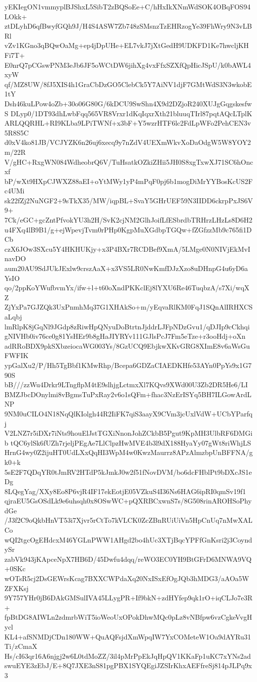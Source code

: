 yEKIegON1vmmyplBJShxL5SibT2zBQSoEe+C/hHxIkXNmWdSOK4OBqFOS94LOkk+
ztDLyhD6qfBwyfGQh9J/H4S4ASW7Zb748zSMsnzTzEHRzogYe39FhWry9N3vLBRl
vZv1KGno3qBQwOaMg+ep4jDpUHe+EL7vkJ7jXtGedH9UDKFD1Ke7hwcljKHFi7T+
E0nrQ7pCGswPNM3eJb6JF5oWCtDW6jihXg4vxFfxSZXfQpHicJSpU/k0bAWL4xyW
qf/MZ8UW/8fJ5XIS4h1GraCbDzGO5ClebCk5Y7AiNV1djF7GMtWdS3N3wkobE1tY
Dsh46kuLPow4oZb+30o06G80G/6kDCU9SwShn4X9d2DZjoR240XUJgGqgskesfwS
DLyp0/1DT93dhLwbFqq565VR8Vrxr1dKqIqxrXth21bluuqTIrl87pqtAQcLTplK
ARLQQRHL+RI9KLba9LPiTWNf+x3bF+Y5wzrHTF6lc2FdLpWFo2PehCEN3v5R8S5C
d0xV4ko81JB/VCJYZK6n26uj6xecq9y7nZdV4UEXmWkvXoDaOdgW5W8YOY2m/22R
V/gHC+RxgWN084WdheobrQ6V/TuHsatkOZkiZHii5JH0S8xgTxwXJ71SC6hOncxf
bP/wXt9HXpCJWXZ88aEI+oYtMWy1yP4mPqF0pj6b1mogDiMrYYBosKcUS2Fc4UMi
sk22fZj2NuNGF2+9sTkX35/MW/iqpBL+SvaY5GHrUEF59N3IIDD6ckrpPxJS6V9+
7Ck/eGC+gcZntPfvokYU3h2H/SvK2cjNM2GlhJoifLfESbrdbTRHrzLHzLs8D6H2
u4FXq4lB9B1/g+ejWpevjTvm0rPHp0KgpMuXGdbpTGQw+fZGfzzMb9c765fi1DCb
czX6JOw3SXcu5Y4HKHUKjy+x3P4BXr7RCDBef9XmA/5LMge0N0NIVjEkMvInavDO
aum20AU9SdJUkJExlw9crszAaX+x3VS5LR0NwKmfDJzXzo8uDHnpG4u6yD6aYsIO
qo/2ppKoYWufbvmYx/ifw+l+t60oXndPKKclEj8lYXU6Re46TuqbzA/s7Xi/wqXZ
ZjYxPa7GJZQk3UxPnmhMq37G1XHAkSo+m/yEqvaRlKM0FqJ1SQnAlIRHXCSaLqbj
lmRlpK8jGqNl9JGdp8zRiwHpQNyuDoBtrtnJjddrLJFpNDzGvu1/qDJIp9cCkhqi
gNIVHb0iv76ce0g81YsHEr9b8gHaJIYRYv111GJlsPcJ7Fm5eTze+r3ooHdj+oXn
adRRoBDX9pkSXbzeiocaWG003Ys/8GzUCQ9EbjkwXKvGRG8XImE8v6aWsGuFWFIK
ypGalXu2/P/Hh5TgBbf1KMwRhp/Bcepa6GDZaCIAEDKHfe53AYn0PpYs9x1G790S
bB///zzWu4Drkr9LTngflpM4tE9slhjgLctmxXl7KQvs9XWd00U3Zb2DR5He6/LI
BMZJbcDOnylmi8vBgmsTuPxRay2v6o1sQFm+fhac3NzErISYq5BH7ILGowArdLNP
9NM0uCILO4N18NqQlKIolgh44R2IiFK7qiS3aayX9CVm3jcUxlVdW+UCbYParfqj
V2LNZ7r5iDXr7iNts9houElJstTGXiNnonJohZCkbB5Pgut9KpMH3UlbRF6DMGib
tQC6ylSk6fUZh7rjeljPEgAe7LlClpzHwMVE4b3l9dX188HyaYy07gWt8riWhjLS
HrnG4wy0Z2ijuHT0UdLXxQqHI3WpM4w0KwzMaurrz8APzAlmzbpUnBFFNA/gk0+k
5sE2F7QDqYR0tJmRV2HTdP5kJmkJ0w2f51fNovDVM/bo6dcFHblPt9bDXcJS1eDg
8LQegYag/XXy8Eo8P6vjR4IF17ekEotjE05VZkuS4I36Ns6HAG6ipRI0qmSv19f1
qjraEU5GsOSdLk9e6uhsqh0x8OSwWC+pQXRBCxwnS7s/8G508rinAROHSoPhydGe
/J3f2C9oQkbHnVT53i7Xjvr5rCtTo7kVLCK0ZcZBnRUiUiVn5HpCnUq7nMwXALCo
wQI2tgcOgEHdcxM46YGLnPWW1AHgd2bo4hUc3XTjBqcYPFfGnKsri2j3CoyndySr
zabVk943jKApceNpX7HB6D/45Dwfu4dqq/reWO3EC0YH9BtGFrD6MNWA9VQ+0SKc
wOTsR5cj2DsGEWrsKcag7BXXCWPdaXq20NxISxEfOgJQb3hMDG3/aAOa5WZFXKsj
9Y757YHr0jB6DAkGMSulIVA45LLygPR+If9bkN+zdHYfep9qk1rO+iqCLJo7e3R+
fpBtDG8AIWLn2zdmrbWiT5ioWeoUxOPokDhwMQc0pLz8vNBfpw6vzCgkeVvgHycl
KL4+afSNMDjCDn180WW+QuAQFsjdXmWpqIW7YxCOMeteW1Oa9dAYRu31Ti/zCmaX
Hs/cI63qr16A6njgj2w6L0tdMoZZ/3il4pMrPpEkJqHpQV1KKaFp1uKC7xYNs2ad
swuEYE3zEbJ/E+8Q7JXE3nS81pgPBX1SYQEgiJZSIrKhxAEFfreSj814pJLPq9x3
